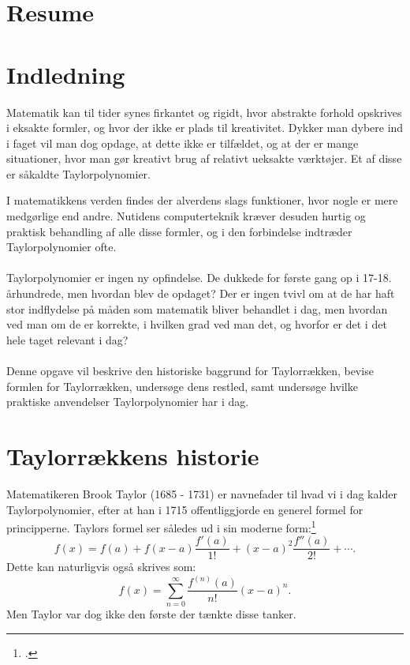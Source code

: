 \documentclass[12pt, a4paper]{article}
\begin{document}
\section*{Resume} %
\blindtext[1-2]
\tableofcontents
\newpage



\section{Indledning} %
Matematik kan til tider synes firkantet og rigidt, hvor abstrakte forhold opskrives i eksakte formler, og hvor der ikke er plads til kreativitet. 
Dykker man dybere ind i faget vil man dog opdage, at dette ikke er tilfældet, og at der er mange situationer, hvor man gør kreativt brug af relativt ueksakte værktøjer. Et af disse er såkaldte Taylorpolynomier.


I matematikkens verden findes der alverdens slags funktioner, hvor nogle er mere medgørlige end andre. Nutidens computerteknik kræver desuden hurtig og praktisk behandling af alle disse formler, og i den forbindelse indtræder Taylorpolynomier ofte.\\
\\
Taylorpolynomier er ingen ny opfindelse. De dukkede for første gang op i 17-18. århundrede, men hvordan blev de opdaget? Der er ingen tvivl om at de har haft stor indflydelse på måden som matematik bliver behandlet i dag, men hvordan ved man om de er korrekte, i hvilken grad ved man det, og hvorfor er det i det hele taget relevant i dag?\\
\\
Denne opgave vil beskrive den historiske baggrund for Taylorrækken, bevise formlen for Taylorrækken, undersøge dens restled, samt undersøge hvilke praktiske anvendelser Taylorpolynomier har i dag.

\section{Taylorrækkens historie} %
Matematikeren Brook Taylor (1685 - 1731) er navnefader til hvad vi i dag kalder Taylorpolynomier, efter at han i 1715 offentliggjorde en generel formel for principperne.
Taylors formel ser således ud i sin moderne form:\footcite[s. 247]{roy_2021}
\begin{equation*}
   f(x)=f(a)+f(x-a)\frac{f'(a)}{1!}+(x-a)^2\frac{f''(a)}{2!}+\cdots. 
\end{equation*}
Dette kan naturligvis også skrives som:
\begin{equation*}
    f(x)=\sum_{n=0}^{\infty}\frac{f^{(n)}(a)}{n!}(x-a)^n.
\end{equation*}
Men Taylor var dog ikke den første der tænkte disse tanker.
\end{document}
